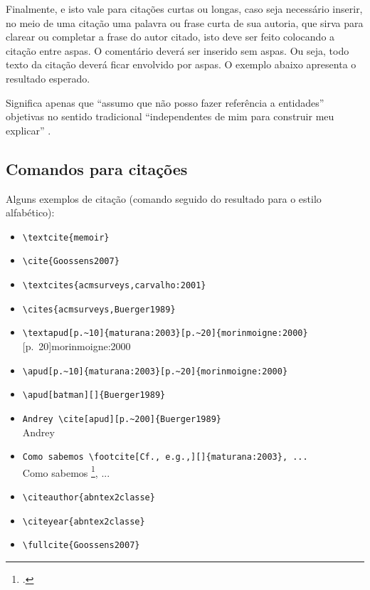 Finalmente, e isto vale para citações curtas ou longas, caso seja necessário inserir, no meio de uma citação uma palavra ou frase curta de sua autoria, que sirva para clarear ou completar a frase do autor citado, isto deve ser feito colocando a citação entre aspas.
O comentário deverá ser inserido sem aspas.
Ou seja, todo texto da citação deverá ficar envolvido por aspas.
O exemplo abaixo apresenta o resultado esperado.

Significa apenas que ``assumo que não posso fazer referência a entidades'' objetivas no sentido tradicional ``independentes de mim para construir meu explicar'' {\textcite[p.~35]{maturana:2003}}.

\subsection{Comandos para citações}\label{referenciasUtilizadas}

Alguns exemplos de citação (comando seguido do resultado para o estilo alfabético):

\begin{itemize}
    \item \verb|\textcite{memoir}| \\ \textcite{memoir}
    \item \verb|\cite{Goossens2007}| \\ \cite{Goossens2007} 
    \item \verb|\textcites{acmsurveys,carvalho:2001}| \\ \textcites{acmsurveys,carvalho:2001}
    \item \verb|\cites{acmsurveys,Buerger1989}| \\ \cites{acmsurveys,Buerger1989}
    \item \verb|\textapud[p.~10]{maturana:2003}[p.~20]{morinmoigne:2000}| \\ [p.~20]{morinmoigne:2000}
    \item \verb|\apud[p.~10]{maturana:2003}[p.~20]{morinmoigne:2000}| \\ 
    \item \verb|\apud[batman][]{Buerger1989}| \\ 
    \item \verb|Andrey \cite[apud][p.~200]{Buerger1989}| \\ Andrey \cite[apud][p.~200]{Buerger1989}
    \item \verb|Como sabemos \footcite[Cf., e.g.,][]{maturana:2003}, ...| \\  Como sabemos \footcite[Cf., e.g.,][]{maturana:2003}, ...
    \item \verb|\citeauthor{abntex2classe}| \\ \citeauthor{abntex2classe}
    \item \verb|\citeyear{abntex2classe}| \\ \citeyear{abntex2classe}
    \item \verb|\fullcite{Goossens2007}| \\ 
    
\end{itemize}


